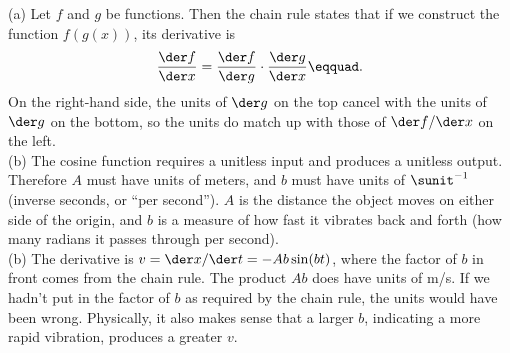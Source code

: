(a) Let $f$ and $g$ be functions. Then the chain rule states that if we construct the function $f(g(x))$, its derivative is
\begin{equation*}
  \frac{\der f}{\der x} = \frac{\der f}{\der g} \cdot \frac{\der g}{\der x}\eqquad.
\end{equation*}
On the right-hand side, the units of $\der g$ on the top cancel with the units of
$\der g$ on the bottom, so the units do match up with those of $\der f/\der x$ on the left.\\
(b) The cosine function requires a unitless input and produces a unitless output. Therefore
$A$ must have units of meters, and $b$ must have units of $\sunit^{-1}$ (inverse seconds, or ``per second'').
$A$ is the distance the object moves on either side of the origin, and $b$ is a measure of how fast it vibrates
back and forth (how many radians it passes through per second).\\
(b) The derivative is $v=\der x/\der t=-Ab\sin(bt)$, where the factor of $b$ in front comes
from the chain rule. The product $Ab$ does have units of m/s. If we hadn't put in the factor
of $b$ as required by the chain rule, the units would have been wrong. Physically, it also makes sense
that a larger $b$, indicating a more rapid vibration, produces a greater $v$.



